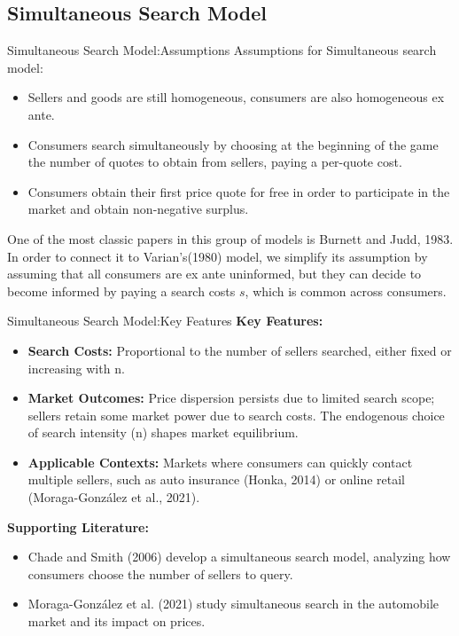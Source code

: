 \documentclass[aspectratio=169]{beamer}  %
\begin{document}
\subsection{Simultaneous Search Model}
\begin{frame}{Simultaneous Search Model:Assumptions}
    Assumptions for Simultaneous search model:
    \begin{itemize}
        \item Sellers and goods are still homogeneous, consumers are also homogeneous ex ante.
        \item Consumers search simultaneously by choosing at the beginning of the game the number of quotes to obtain from sellers, paying a per-quote cost.
        \item Consumers obtain their first price quote for free in order to participate in the market and obtain non-negative surplus.
    \end{itemize}
    One of the most classic papers in this group of models is Burnett and Judd, 1983. In order to connect it to Varian’s(1980) model, we simplify its assumption by assuming that all consumers are ex ante uninformed, but they can decide to become informed by paying a search costs $s$, which is common across consumers.
\end{frame}

\begin{frame}{Simultaneous Search Model:Key Features}
    \textbf{Key Features:}
    \begin{itemize}
        \item \textbf{Search Costs:} Proportional to the number of sellers searched, either fixed or increasing with n.
        \item \textbf{Market Outcomes:} Price dispersion persists due to limited search scope; sellers retain some market power due to search costs. The endogenous choice of search intensity (n) shapes market equilibrium.
        \item \textbf{Applicable Contexts:} Markets where consumers can quickly contact multiple sellers, such as auto insurance (Honka, 2014) or online retail (Moraga-González et al., 2021).
    \end{itemize}
    \textbf{Supporting Literature:}
    \begin{itemize}
        \item Chade and Smith (2006) develop a simultaneous search model, analyzing how consumers choose the number of sellers to query.
        \item Moraga-González et al. (2021) study simultaneous search in the automobile market and its impact on prices.
    \end{itemize}
\end{frame}
\end{document}
